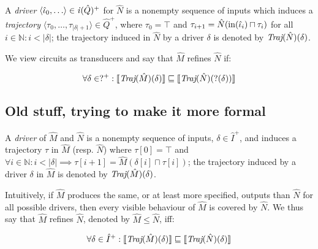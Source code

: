 A \textit{driver} $\langle \hat \iota_{0}, \ldots \rangle \in \mathit{i}(\hat Q)^{+}$ for $\hat N$ is a nonempty sequence of inputs which induces a \textit{trajectory} $\langle \tau_{0}, \ldots, \tau_{| \delta | + 1} \rangle \in \hat Q^{+}$, where $\tau_{0} = \top$ and $\tau_{i+1} = \hat N(\operatorname{in}(\hat \iota_{i}) \sqcap \tau_{i})$ for all $i \in \mathbb{N} : i < | \delta |$; the trajectory induced in $\hat N$ by a driver $\delta$ is denoted by $\textit{Traj}(\hat N)(\delta)$.

We view circuits as transducers and say that $\hat M$ refines $\hat N$ if:

\begin{equation*}
\forall \delta \in ?^{+} : \llbracket\textit{Traj}(\hat M)(\delta)\rrbracket \sqsubseteq \llbracket\textit{Traj}(\hat N)(?(\delta))\rrbracket
\end{equation*}


\subsection{Old stuff, trying to make it more formal}

A \textit{driver} of $\hat M$ and $\hat N$ is a nonempty sequence of inputs, $\delta \in \hat I^{+}$, and induces a trajectory $\tau$ in $\hat M$ (resp. $\hat N$) where $\tau[0] = \top$ and $\forall i \in \mathbb{N} : i < | \delta | \implies \tau[i+1] = \hat M(\delta[i] \sqcap \tau[i])$; the trajectory induced by a driver $\delta$ in $\hat M$ is denoted by $\textit{Traj}(\hat M)(\delta)$.

Intuitively, if $\hat M$ produces the same, or at least more specified, outputs than $\hat N$ for all possible drivers, then every visible behaviour of $\hat M$ is covered by $\hat N$. We thus say that $\hat M$ refines $\hat N$, denoted by $\hat M \leq \hat N$, iff:



\begin{equation*}
\forall \delta \in \hat I^{+} : \llbracket\textit{Traj}(\hat M)(\delta)\rrbracket \sqsubseteq \llbracket\textit{Traj}(\hat N)(\delta)\rrbracket
\end{equation*}


